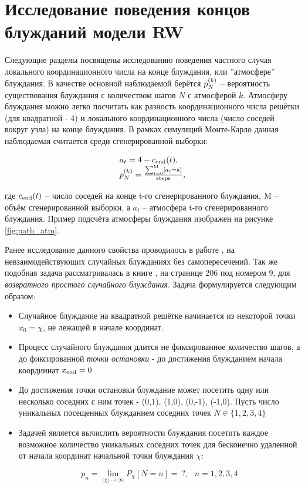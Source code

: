 \section{Исследование поведения концов блужданий модели RW}
\label{sec:atm}

Следующие разделы посвящены исследованию поведения частного случая локального координационного числа на конце блуждания, или ''атмосфере'' блуждания. 
В качестве основной наблюдаемой берётся $p^{(k)}_N$ -- вероятность существования блуждания с количеством шагов $N$ с атмосферой $k$.
Атмосферу блуждания можно легко посчитать как разность координационного числа решётки (для квадратной - 4) и локального координационного числа (число соседей вокруг узла) на конце блуждания.
В рамках симуляций Монте-Карло данная наблюдаемая считается среди сгенерированной выборки:

\begin{large}

\begin{equation}
\begin{array}{l}
a_t = 4 - c_{\textup{end}}(t), \\
p^{(k)}_N = \frac{\sum_{t=0}^{\textup{M}} [a_t = k]}{\textup{steps}},
\label{eq:pkn}
\end{array}
\end{equation}

\end{large}
где $c_{\textup{end}}(t)$ -- число соседей на конце t-го сгенерированного блуждания, $\textup{M}$ -- объём сгенерированной выборки, а $a_t$ -- атмосфера t-го сгенерированного блуждания. Пример подсчёта атмосферы блуждания изображен на рисунке \ref{fig:path_atm}.

Ранее исследование данного свойства проводилось в работе \cite{owczarek2008scaling}, на невзаимодействующих случайных блужданиях без самопересечений. 
Так же подобная задача рассматривалась в книге \cite{Spitser1969}, на странице 206 под номером 9, для \textit{возвратного простого случайного блуждания}. Задача формулируется следующим образом:

\begin{itemize}
    \item Случайное блуждание на квадратной решётке начинается из некоторой точки $x_0 = \chi$, не лежащей в начале координат.
    \item Процесс случайного блуждания длится не фиксированное количество шагов, а до фиксированной \textit{точки остановки} - до достижения блужданием начала коордиинат $x_{\textup{end}} = 0$
    \item До достижения точки остановки блуждание может посетить одну или несколько соседних с ним точек - (0,1), (1,0), (0,-1), (-1,0). Пусть число уникальных посещенных блужданием соседних точек  $N \in \{1, 2, 3, 4\}$
    \item Задачей является вычислить вероятности блуждания посетить каждое возможное количество уникальных соседних точек для бесконечно удаленной от начала координат начальной точки блуждания $\chi$:
    
    \[ p_{n} = \lim_{|\chi|\to \infty} P_{\chi}[N = n] =\ ?,\ \ \ n = 1, 2, 3, 4\]
\end{itemize}

